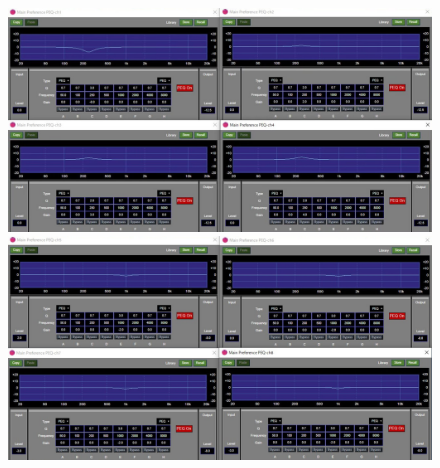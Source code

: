 \documentclass[11pt,a4j]{jreport}
\begin{document}

\begin{figure}[H]
  \begin{minipage}[b]{.5\linewidth}
    \centering
    \includegraphics[width=.9\linewidth]{images/experimentField/afcParameters/01alpha/05manualEQ6.jpg}
  \end{minipage}%
  \begin{minipage}[b]{.5\linewidth}
    \centering
    \includegraphics[width=.9\linewidth]{images/experimentField/afcParameters/01alpha/05manualEQ7.jpg}
  \end{minipage}


\end{figure}
\end{document}
